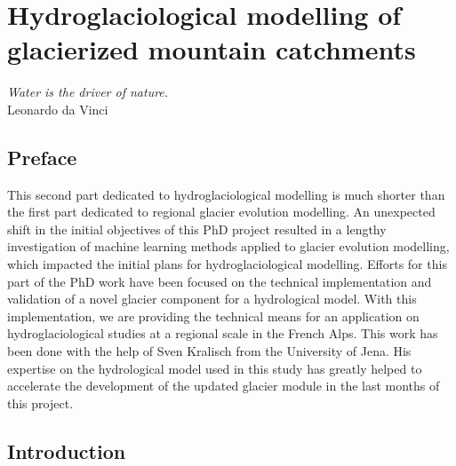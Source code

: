 \chapter{Hydroglaciological modelling of glacierized mountain catchments}
\label{chap:discussion}

\begin{flushright}
\begin{small}
\textit{Water is the driver of nature.}\\
Leonardo da Vinci
\end{small}
\end{flushright}

\section*{Preface}

This second part dedicated to hydroglaciological modelling is much shorter than the first part dedicated to regional glacier evolution modelling. An unexpected shift in the initial objectives of this PhD project resulted in a lengthy investigation of machine learning methods applied to glacier evolution modelling, which impacted the initial plans for hydroglaciological modelling. Efforts for this part of the PhD work have been focused on the technical implementation and validation of a novel glacier component for a hydrological model. With this implementation, we are providing the technical means for an application on hydroglaciological studies at a regional scale in the French Alps. This work has been done with the help of Sven Kralisch from the University of Jena. His expertise on the hydrological model used in this study has greatly helped to accelerate the development of the updated glacier module in the last months of this project.

\section{Introduction}

